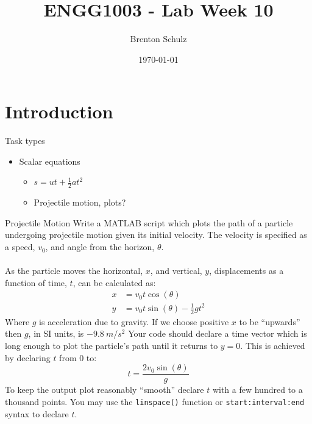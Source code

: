 \documentclass{lab}
\title{ENGG1003 - Lab Week 10}
\author{Brenton Schulz}
\date{\today}
\begin{document}
\maketitle

\section{Introduction}

Task types

\begin{itemize}
	\item Scalar equations
		\begin{itemize}
			\item $s=ut+\frac{1}{2}at^2$
			\item Projectile motion, plots?
		\end{itemize}
\end{itemize}

\begin{task}{Projectile Motion}{}
Write a MATLAB script which plots the path of a particle undergoing projectile motion given its initial velocity. The velocity is specified as a speed, $v_0$, and angle from the horizon, $\theta$.
\\~\\
As the particle moves the horizontal, $x$, and vertical, $y$, displacements as a function of time, $t$, can be calculated as:
\begin{align*}
x &= v_0 t \cos(\theta) \\
y &= v_0 t \sin(\theta) - \frac{1}{2}g t^2
\end{align*}
Where $g$ is acceleration due to gravity. If we choose positive $x$ to be ``upwards'' then $g$, in SI units, is $-9.8~{m/s^2}$
Your code should declare a time vector which is long enough to plot the particle's path until it returns to $y=0$. This is achieved by declaring $t$ from 0 to:
\begin{equation*}
t = \frac{2 v_0 \sin(\theta)}{g}
\end{equation*}
To keep the output plot reasonably ``smooth'' declare $t$ with a few hundred to a thousand points. You may use the \texttt{linspace()} function or \texttt{start:interval:end} syntax to declare $t$.
\\~\\
\end{task}
\end{document}
